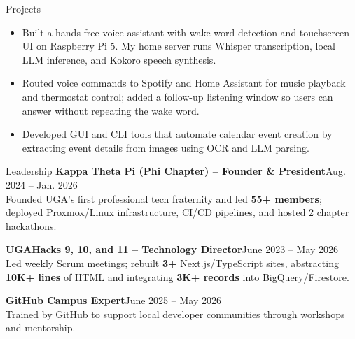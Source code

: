 \begin{rSection}{Projects}
    \begin{itemize}
        \item Built a hands-free voice assistant with wake-word detection and touchscreen UI on Raspberry Pi 5. My home server runs Whisper transcription, local LLM inference, and Kokoro speech synthesis.  \item Routed voice commands to Spotify and Home Assistant for music playback and thermostat control; added a follow-up listening window so users can answer without repeating the wake word.
    \end{itemize}
    \entrygap

    \begin{itemize}
        \item Developed GUI and CLI tools that automate calendar event creation by extracting event details from images using OCR and LLM parsing.
    \end{itemize}


\end{rSection}


\begin{rSection}{Leadership}
    \textbf{Kappa Theta Pi (Phi Chapter) -- Founder \& President}\hfill Aug. 2024 -- Jan. 2026\\
    Founded UGA's first professional tech fraternity and led \textbf{55+ members}; deployed Proxmox/Linux infrastructure, CI/CD pipelines, and hosted 2 chapter hackathons.

    \entrygap
    \textbf{UGAHacks 9, 10, and 11 -- Technology Director}\hfill June 2023 -- May 2026\\
    Led weekly Scrum meetings; rebuilt \textbf{3+} Next.js/TypeScript sites, abstracting \textbf{10K+ lines} of HTML and integrating \textbf{3K+ records} into BigQuery/Firestore.

    \entrygap
    \textbf{GitHub Campus Expert}\hfill June 2025 -- May 2026\\
    Trained by GitHub to support local developer communities through workshops and mentorship.
\end{rSection}

